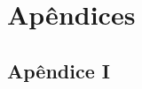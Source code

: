 \chapter[Apêndices]{Apêndices}
\label{cap-apendices}

\section{Apêndice I}
\label{section:apendice_I}

